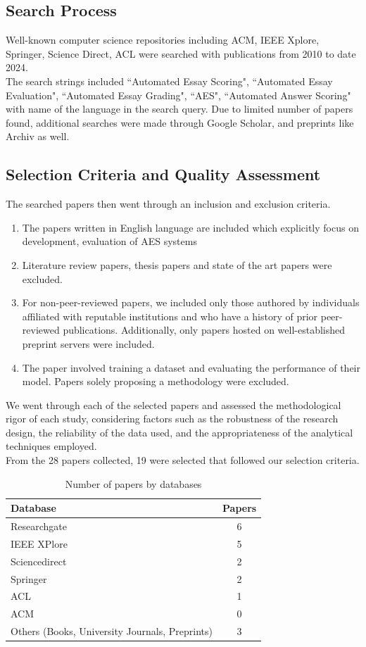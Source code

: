 \documentclass{article}
\begin{document}
	\subsection{Search Process}
	Well-known computer science repositories including ACM, IEEE Xplore, Springer, Science Direct, ACL were searched with publications from 2010 to date 2024. \\
	The search strings included ``Automated Essay Scoring", ``Automated Essay Evaluation", ``Automated Essay Grading", ``AES", ``Automated Answer Scoring"  with name of the language in the search query. Due to limited number of papers found, additional searches were made through Google Scholar, and preprints like Archiv as well.
	\\
	\subsection{Selection Criteria and Quality Assessment}
	The searched papers then went through an inclusion and exclusion criteria.
	\begin{enumerate}[label=\textbf{Criteria \arabic*}, leftmargin=2cm]
		\item The papers written in English language are included which explicitly focus on development, evaluation of AES systems
		\item Literature review papers, thesis papers and state of the art papers were excluded.
		\item For non-peer-reviewed papers, we included only those authored by individuals affiliated with reputable institutions and who have a history of prior peer-reviewed publications. Additionally, only papers hosted on well-established preprint servers were included.
		\item The paper involved training a dataset and evaluating the performance of their model. Papers solely proposing a methodology were excluded.
	\end{enumerate}
	We went through each of the selected papers and assessed the methodological rigor of each study, considering factors such as the robustness of the research design, the reliability of the data used, and the appropriateness of the analytical techniques employed. \\
	From the 28 papers collected, 19 were selected that followed our selection criteria.
	\renewcommand{\arraystretch}{1.5}
	\begin{table}[]
		\centering
		\begin{tabular}{p{3in}  c}
			\hline
			\textbf{Database} & \textbf{Papers} \\ \hline
			Researchgate & 6 \\
			IEEE XPlore & 5 \\
			Sciencedirect & 2 \\
			Springer & 2 \\
			ACL & 1 \\ 
			ACM & 0 \\
			Others (Books, University Journals, Preprints) & 3 \\
			\hline
		\end{tabular}
		\caption*{Number of papers by databases}
		\label{papersbydb}
	\end{table}
\end{document}
